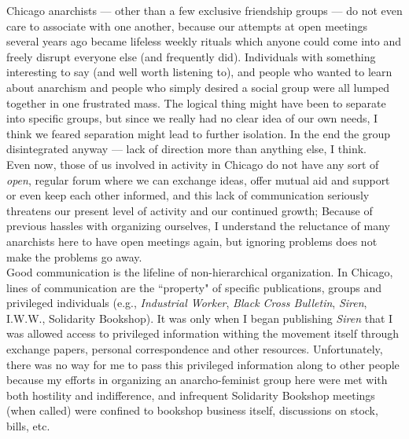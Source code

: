Chicago anarchists --- other than a few exclusive friendship groups --- do not even care to associate with one another, because our attempts at open meetings several years ago became lifeless weekly rituals which anyone could come into and freely disrupt everyone else (and frequently did). Individuals with something interesting to say (and well worth listening to), and people who wanted to learn about anarchism and people who simply desired a social group were all lumped together in one frustrated mass. The logical thing might have been to separate into specific groups, but since we really had no clear idea of our own needs, I think we feared separation might lead to further isolation. In the end the group disintegrated anyway --- lack of direction more than anything else, I think.\\
Even now, those of us involved in activity in Chicago do not have any sort of \emph{open}, regular forum where we can exchange ideas, offer mutual aid and support or even keep each other informed, and this lack of communication seriously threatens our present level of activity and our continued growth; Because of previous hassles with organizing ourselves, I understand the reluctance of many anarchists here to have open meetings again, but ignoring problems does not make the problems go away.\\
Good communication is the lifeline of non-hierarchical organization. In Chicago, lines of communication are the ``property" of specific publications, groups and privileged individuals (e.g., \emph{Industrial Worker}, \emph{Black Cross Bulletin}, \emph{Siren}, I.W.W., Solidarity Bookshop). It was only when I began publishing \emph{Siren} that I was allowed access to privileged information withing the movement itself through exchange papers, personal correspondence and other resources. Unfortunately, there was no way for me to pass this privileged information along to other people because my efforts in organizing an anarcho-feminist group here were met with both hostility and indifference, and infrequent Solidarity Bookshop meetings (when called) were confined to bookshop business itself, discussions on stock, bills, etc.\\

